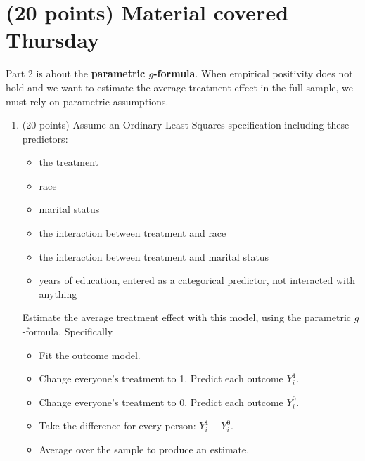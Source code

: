 \documentclass[10pt]{article}
\begin{document}
\section{(20 points) Material covered Thursday}
Part 2 is about the \textbf{parametric $g$-formula}. When empirical positivity does not hold and we want to estimate the average treatment effect in the full sample, we must rely on parametric assumptions.
\begin{enumerate}
    \item (20 points) Assume an Ordinary Least Squares specification including these predictors:
\begin{itemize}
    \item the treatment
    \item race
    \item marital status
    \item the interaction between treatment and race
    \item the interaction between treatment and marital status
    \item years of education, entered as a categorical predictor, not interacted with anything
\end{itemize}
Estimate the average treatment effect with this model, using the parametric $g$-formula. Specifically
\begin{itemize}
    \item Fit the outcome model.
    \item Change everyone's treatment to 1. Predict each outcome $Y_i^1$.
    \item Change everyone's treatment to 0. Predict each outcome $Y_i^0$.
    \item Take the difference for every person: $Y_i^1 - Y_i^0$.
    \item Average over the sample to produce an estimate.
\end{itemize}
\end{enumerate}
\end{document}
